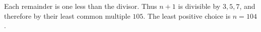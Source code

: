 Each remainder is one less than the divisor. Thus $n+1$ is divisible by $3,5,7$, and therefore by their least common multiple $105$. The least positive choice is $\boxed{n=104}$.
